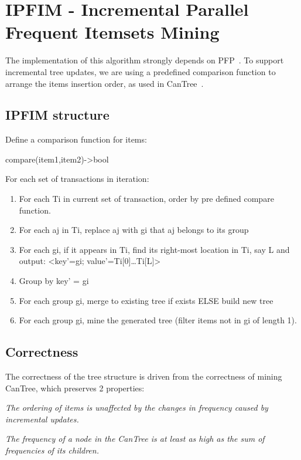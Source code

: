 \section{IPFIM - Incremental Parallel Frequent Itemsets Mining}
The implementation of this algorithm strongly depends on PFP~\cite{li2008pfp}. To support incremental tree updates, we are using a predefined comparison function to arrange the items insertion order, as used in CanTree~\cite{leung2005cantree}.

\subsection{IPFIM structure}
\begin{steps}
	\item Define a comparison function for items: 
	
	compare(item1,item2)->bool
	\item For each set of transactions in iteration:
		\begin{enumerate}
			\item For each Ti in current set of transaction, order by pre defined compare function.
			\item For each aj in Ti, replace aj with gi that aj belongs to its group
			\item For each gi, if it appears in Ti, find its right-most location in Ti, say L and output:
 <key'=gi; value'={Ti[0]…Ti[L]}>
 			\item Group by key' = gi
 			\item For each group gi, merge to existing tree if exists ELSE build new tree
 			\item For each group gi, mine the generated tree (filter items not in gi of length 1).
		\end{enumerate}
\end{steps}

\subsection{Correctness}
The correctness of the tree structure is driven from the correctness of mining CanTree, which preserves 2 properties:
\begin{properties}
\item \textit{The ordering of items is unaffected by the
changes in frequency caused by incremental updates.}
\item \textit{The frequency of a node in the CanTree is at
least as high as the sum of frequencies of its children.}
\end{properties}


